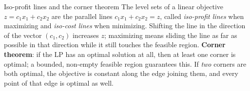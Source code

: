 \begin{rulebox}{Iso-profit lines and the corner theorem}
The level sets of a linear objective $z=c_{1}x_{1}+c_{2}x_{2}$ are the
parallel lines $c_{1}x_{1}+c_{2}x_{2}=z$, called \emph{iso-profit lines} when maximizing and \emph{iso-cost lines} when minimizing. Shifting the line in the direction
of the vector $(c_{1},c_{2})$ increases $z$; maximizing means sliding the
line as far as possible in that direction while it still touches the
feasible region. \textbf{Corner theorem}: if the LP has an
optimal solution at all, then at least one corner is optimal; a bounded,
non-empty feasible region guarantees this. If \emph{two} corners are both
optimal, the objective is constant along the edge joining them, and every
point of that edge is optimal as well.
\end{rulebox}

